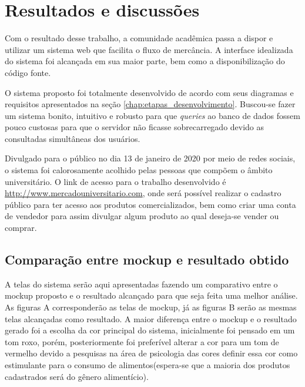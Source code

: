 \chapter{Resultados e discussões}
\label{chap:resultados}

Com o resultado desse trabalho, a comunidade acadêmica passa a dispor e utilizar um sistema web que facilita o fluxo de mercância. A interface idealizada do sistema foi alcançada em sua maior parte, bem como a disponibilização do código fonte.

O sistema proposto foi totalmente desenvolvido de acordo com seus diagramas e requisitos apresentados na seção \ref{chap:etapas_desenvolvimento}. Buscou-se fazer um sistema bonito, intuitivo e robusto para que \textit{queries} ao banco de dados fossem pouco custosas para que o servidor não ficasse sobrecarregado devido as consultadas simultâneas dos usuários.

Divulgado para o público no dia 13 de janeiro de 2020 por meio de redes sociais, o sistema foi calorosamente acolhido pelas pessoas que compõem o âmbito universitário. O link de acesso para o trabalho desenvolvido é \url{http://www.mercadouniversitario.com}, onde será possível realizar o cadastro público para ter acesso aos produtos comercializados, bem como criar uma conta de vendedor para assim divulgar algum produto ao qual deseja-se vender ou comprar.

\section{Comparação entre mockup e resultado obtido}

A telas do sistema serão aqui apresentadas fazendo um comparativo entre o mockup proposto e o resultado alcançado para que seja feita uma melhor análise. As figuras A corresponderão as telas de mockup, já as figuras B serão as mesmas telas alcançadas como resultado. A maior diferença entre o mockup e o resultado gerado foi a escolha da cor principal do sistema, inicialmente foi pensado em um tom roxo, porém, posteriormente foi preferível alterar a cor para um tom de vermelho devido a pesquisas na área de psicologia das cores definir essa cor como estimulante para o consumo de alimentos(espera-se que a maioria dos produtos cadastrados será do gênero alimentício).

